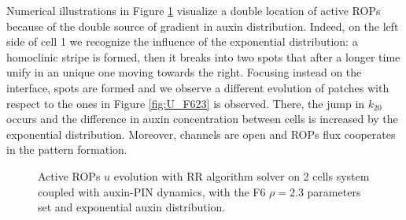 Numerical illustrations in Figure \ref{fig:U_F623_exp} visualize a double location of active ROPs because of the double source of gradient in auxin distribution. Indeed, on the left side of cell 1 we recognize the influence of the exponential distribution: a homoclinic stripe is formed, then it breaks into two spots that after a longer time unify in an unique one moving towards the right. Focusing instead on the interface, spots are formed and we observe a different evolution of patches with respect to the ones in Figure \ref{fig:U_F623} is observed. There, the jump in $k_{20}$ occurs and the difference in auxin concentration between cells is increased by the exponential distribution. Moreover, channels are open and ROPs flux cooperates in the pattern formation.
\begin{figure}[H]
    \centering
    \quad
    \quad
    \quad
    \quad
    \quad
    \quad
    \quad
    \quad
    \quad
    \quad
    \caption[2cell RR Active ROPs coupled auxin-PIN - with the F6 $\rho = 2.3$ set and exponential distribution]{Active ROPs $u$ evolution with RR algorithm solver on 2 cells system coupled with auxin-PIN dynamics, with the F6 $\rho = 2.3$ parameters set and exponential auxin distribution.}
    \label{fig:U_F623_exp}
\end{figure}

